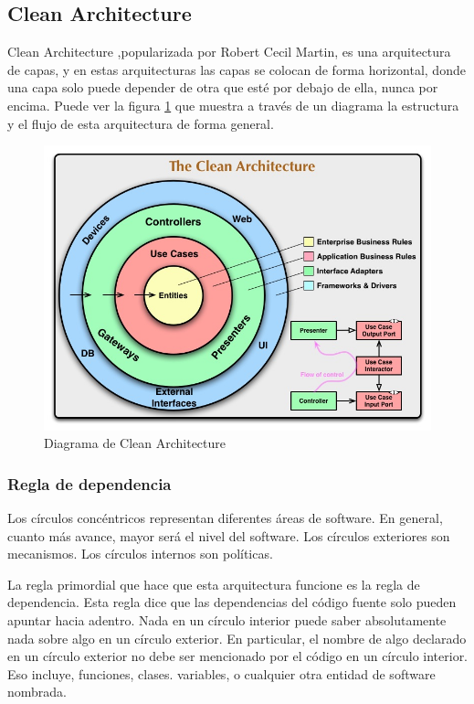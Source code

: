   \subsection{Clean Architecture}
  Clean Architecture ,popularizada por Robert Cecil Martin, es una arquitectura de capas, y
  en estas arquitecturas las capas se colocan de forma horizontal, donde una capa solo puede depender
  de otra que esté por debajo de ella, nunca por encima. Puede ver la figura \ref{fig:clean_architecture} que muestra a través
  de un diagrama la estructura y el flujo de esta arquitectura de forma general.
  
\begin{figure}
	\centering
	\includegraphics[width = 14cm]{MainMatter/CleanArchitecture.jpg}
	\caption{Diagrama de Clean Architecture }
	\label{fig:clean_architecture}
	
\end{figure}	

\subsubsection{Regla de dependencia}
  
  Los círculos concéntricos representan diferentes áreas de software. En general, cuanto más avance, mayor será el nivel del software. Los círculos exteriores son mecanismos. Los círculos internos son políticas.
  
La regla primordial que hace que esta arquitectura funcione es la regla de dependencia. Esta regla dice que las dependencias del código fuente solo pueden apuntar hacia adentro. Nada en un círculo interior puede saber absolutamente nada sobre algo en un círculo exterior. En particular, el nombre de algo declarado en un círculo exterior no debe ser mencionado por el código en un círculo interior. Eso incluye, funciones, clases. variables, o cualquier otra entidad de software nombrada.


